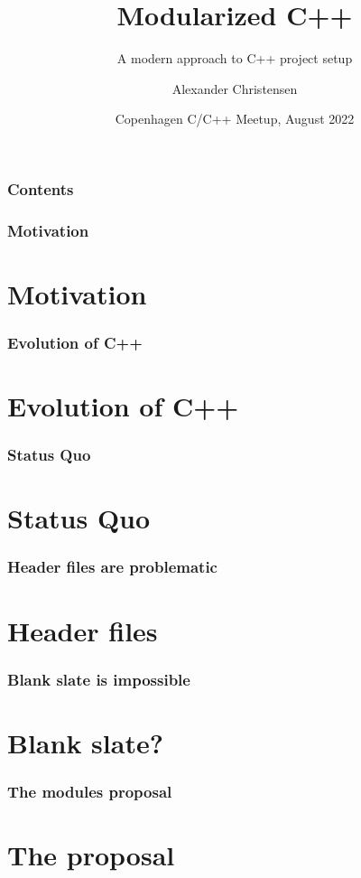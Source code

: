 \documentclass{beamer}
\title{Modularized C++}
\subtitle{A modern approach to C++ project setup}
\author{Alexander Christensen}
\institute{}
\date[VLC]
{Copenhagen C/C++ Meetup, August 2022}
\begin{document}
%
%
\begin{frame}[plain]
    \titlepage
\end{frame}


%
%
\begin{frame}[plain]
\frametitle{Contents}
\tableofcontents
\end{frame}


%
%
\begin{frame}[plain]
\frametitle{Motivation}
\section{Motivation}
\end{frame}


%
%
\begin{frame}[plain]
\frametitle{Evolution of C++}
\section{Evolution of C++}
\end{frame}


%
%
\begin{frame}[plain]
\frametitle{Status Quo}
\section{Status Quo}
\end{frame}


%
%
\begin{frame}[plain]
\frametitle{Header files are problematic}
\section{Header files}
\end{frame}


%
%
\begin{frame}[plain]
\frametitle{Blank slate is impossible}
\section{Blank slate?}
\end{frame}


%
%
\begin{frame}[plain]
\frametitle{The modules proposal}
\section{The proposal}
\end{frame}
\end{document}
